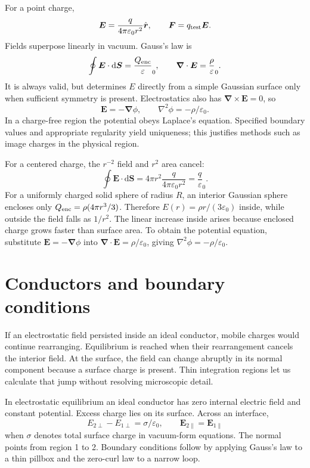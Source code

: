 \documentclass[11pt,oneside]{book}
\newcommand{\dd}{\mathrm{d}}
\newcommand{\vect}[1]{\boldsymbol{#1}}
\newcommand{\grad}{\boldsymbol{\nabla}}
\newcommand{\lap}{\nabla^2}
\newcommand{\eps}{\varepsilon_0}
\theoremstyle{reviewstyle}
\begin{document}
For a point charge,
\begin{equation}
\vect E=\frac{q}{4\pi\eps r^2}\hat{\vect r},\qquad \vect F=q_{\rm test}\vect E.
\end{equation}
Fields superpose linearly in vacuum. Gauss's law is
\begin{equation}\oint\vect E\cdot\dd\vect S=\frac{Q_{\rm enc}}\eps,\qquad \grad\cdot\vect E=\frac\rho\eps.\end{equation}
It is always valid, but determines $E$ directly from a simple Gaussian surface only when sufficient symmetry is present. Electrostatics also has $\grad\times\vect E=0$, so
\begin{equation}\vect E=-\grad\phi,\qquad \lap\phi=-\rho/\eps.\end{equation}
In a charge-free region the potential obeys Laplace's equation. Specified boundary values and appropriate regularity yield uniqueness; this justifies methods such as image charges in the physical region.

For a centered charge, the $r^{-2}$ field and $r^2$ area cancel:
\begin{equation}
\oint\vect E\cdot\dd\vect S=4\pi r^2\frac{q}{4\pi\eps r^2}
=\frac q\eps.
\end{equation}
For a uniformly charged solid sphere of radius $R$, an interior Gaussian sphere encloses only $Q_{
\rm enc}=\rho(4\pi r^3/3)$. Therefore $E(r)=\rho r/(3\eps)$ inside, while outside the field falls as $1/r^2$. The linear increase inside arises because enclosed charge grows faster than surface area. To obtain the potential equation, substitute $\vect E=-\grad\phi$ into $\grad\cdot\vect E=\rho/\eps$, giving $\lap\phi=-\rho/\eps$.

\section{Conductors and boundary conditions}
If an electrostatic field persisted inside an ideal conductor, mobile charges would continue rearranging. Equilibrium is reached when their rearrangement cancels the interior field. At the surface, the field can change abruptly in its normal component because a surface charge is present. Thin integration regions let us calculate that jump without resolving microscopic detail.

In electrostatic equilibrium an ideal conductor has zero internal electric field and constant potential. Excess charge lies on its surface. Across an interface,
\begin{equation}E_{2\perp}-E_{1\perp}=\sigma/\eps,\qquad \vect E_{2\parallel}=\vect E_{1\parallel}\end{equation}
when $\sigma$ denotes total surface charge in vacuum-form equations. The normal points from region 1 to 2. Boundary conditions follow by applying Gauss's law to a thin pillbox and the zero-curl law to a narrow loop.
\end{document}
